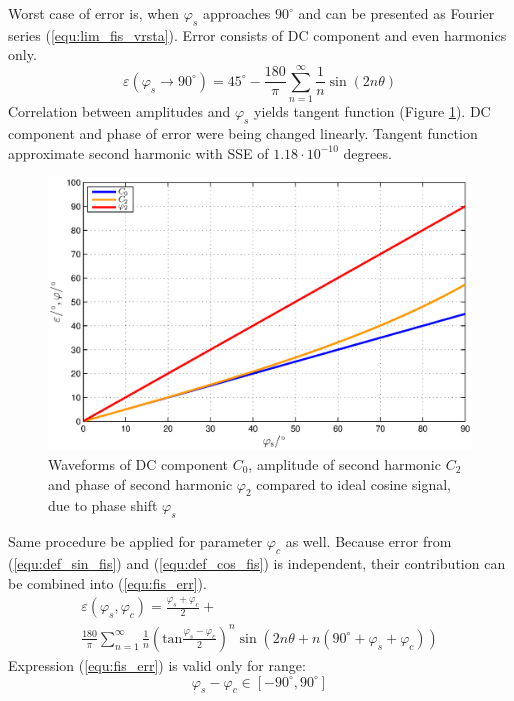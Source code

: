\documentclass[a4paper]{article}
\begin{document}
Worst case of error is, when $\varphi_s$ approaches $90^\circ$ and can be presented as Fourier series (\ref{equ:lim_fis_vrsta}). Error consists of DC component and even harmonics only.
\begin{equation}
\label{equ:lim_fis_vrsta}
\varepsilon(\varphi_{s} \rightarrow 90^\circ) = 45^\circ - \frac{180}{\pi}\sum_{n=1}^{\infty}\frac{1}{n} \sin (2n \theta)
\end{equation}
Correlation between amplitudes and $\varphi_{s}$ yields tangent function (Figure \ref{fig:fis}). DC component and phase of error were being changed linearly. Tangent function approximate second harmonic with SSE of $1.18 \cdot 10^{-10}$ degrees.
\begin{figure}[!htb]
	\begin{center}
		\includegraphics[width=\linewidth]{./Slike/fis.eps}
		\caption{Waveforms of DC component $C_0$, amplitude of second harmonic  $C_2$ and phase of second harmonic $\varphi_2$ compared to ideal cosine signal, due to phase shift $\varphi_{s}$} \label{fig:fis}
	\end{center}
\end{figure}

Same procedure be applied for parameter $\varphi_c$ as well.
Because error from (\ref{equ:def_sin_fis}) and (\ref{equ:def_cos_fis}) is independent, their contribution can be combined into (\ref{equ:fis_err}).
\begin{multline}
\label{equ:fis_err}
\varepsilon(\varphi_{s},\varphi_{c}) = \frac{\varphi_{s}+\varphi_{c}}{2}+\\ \frac{180}{\pi}\sum_{n=1}^{\infty}\frac{1}{n} (\mathrm{tan}\frac{\varphi_{s}-\varphi_{c}}{2})^n \sin (2n \theta+n(90^\circ +\varphi_{s}+\varphi_{c}))
\end{multline}
Expression (\ref{equ:fis_err}) is valid only for range:
$$ \varphi_{s}-\varphi_{c} \in [ -90^\circ , 90^\circ ] $$
\end{document}
